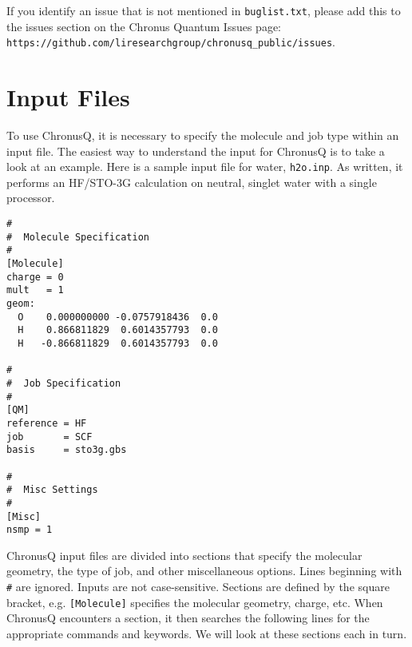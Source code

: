\documentclass[12pt]{article}
\begin{document}
   If you identify an issue that is not mentioned in \texttt{buglist.txt}, please add this to the issues section
   on the Chronus Quantum Issues page:  \newline \texttt{https://github.com/liresearchgroup/chronusq\_public/issues}. 

  \section{Input Files} \label{sec:InputFiles}
  To use ChronusQ, it is necessary to specify the molecule and job type within an input file. The easiest way to understand the input for ChronusQ is to take a look at an example. Here is a sample input file for water, \texttt{h2o.inp}. As written, it performs an HF/STO-3G calculation on neutral, singlet water with a single processor.
\begin{lstlisting}
#
#  Molecule Specification
#
[Molecule]
charge = 0
mult   = 1
geom:
  O    0.000000000 -0.0757918436  0.0
  H    0.866811829  0.6014357793  0.0
  H   -0.866811829  0.6014357793  0.0

#
#  Job Specification
#
[QM]
reference = HF
job       = SCF 
basis     = sto3g.gbs

#
#  Misc Settings
#
[Misc]
nsmp = 1
\end{lstlisting}
ChronusQ input files are divided into sections that specify the molecular geometry, the type of job, and other miscellaneous options. Lines beginning with \texttt{\#} are ignored. Inputs are not case-sensitive. Sections are defined by the square bracket, e.g. \texttt{[Molecule]} specifies the molecular geometry, charge, etc. When ChronusQ encounters a section, it then searches the following lines for the appropriate commands and keywords. We will look at these sections each in turn. 
   
\end{document}
